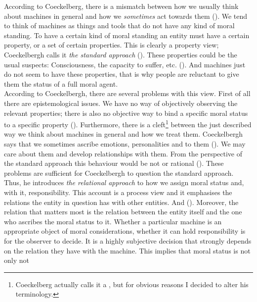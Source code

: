 \documentclass{article}
\begin{document}
According to Coeckelberg, there is a mismatch between how we usually think
about machines in general and how we \textit{sometimes} act towards them
(\cite[p. 61]{coeckelbergh2014moral}). We tend to think of machines as
things and tools that do not have any kind of moral standing. To have a certain
kind of moral standing an entity must have a certain property, or a set of
certain properties. This is clearly a property view; Coeckelbergh calls it \textit{the
standard approach} (\cite[p. 62]{coeckelbergh2014moral}). These properties could be the
usual suspects: Consciousness, the capacity to suffer, etc. (\cite[p.
62-63]{coeckelbergh2014moral}). And machines just do not seem to have these
properties, that is why people are reluctant to give them the status of a full
moral agent.\\
According to Coeckelbergh, there are several problems with this
view. First of all there are epistemological issues. We have no way of
objectively observing the relevant properties; there is also no objective way to
bind a specific moral status to a specific property
(\cite[p. 63]{coeckelbergh2014moral}). Furthermore, there is a
cleft\footnote{Coeckelberg actually calls it a , but for obvious reasons I
decided to alter his terminology.} between the just described way we think about
machines in general and how we treat them. Coeckelbergh says that we
sometimes ascribe emotions, personalities and  to them (\cite[p.
62, 64]{coeckelbergh2014moral}). We may care about them and develop
relationships with them. From the perspective of the standard approach this
behaviour would be not  or rational (\cite[p.
64]{coeckelbergh2014moral}). These problems are sufficient for Coeckelbergh to
question the standard approach.\\
 Thus, he introduces \textit{the relational approach} to how we assign
moral status and, with it, responsibility. This account is a process view and it
emphasises the relations the entity in question has with other entities. And
 (\cite[p. 64]{coeckelbergh2014moral}). Moreover, the relation that
matters most is the relation between the entity itself and the one who ascribes
the moral status to it. Whether a particular machine is an appropriate object of
moral considerations, whether it can hold responsibility is for the observer to
decide. It is a highly subjective decision that strongly depends on the relation
they have with the machine. This implies that moral status is not only not
\end{document}
